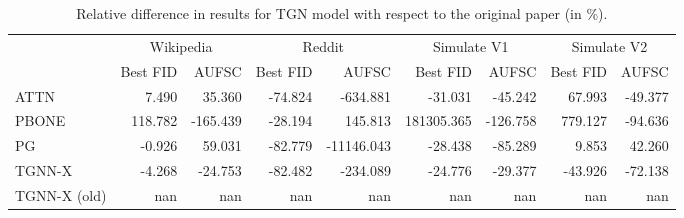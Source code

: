 \begin{table}
\centering
\begin{tabular}{lrrrrrrrr}
\toprule
 & \multicolumn{2}{c}{Wikipedia} & \multicolumn{2}{c}{Reddit} & \multicolumn{2}{c}{Simulate V1} & \multicolumn{2}{c}{Simulate V2} \\
 & Best FID & AUFSC & Best FID & AUFSC & Best FID & AUFSC & Best FID & AUFSC \\
\midrule
ATTN & 7.490 & 35.360 & -74.824 & -634.881 & -31.031 & -45.242 & 67.993 & -49.377 \\
PBONE & 118.782 & -165.439 & -28.194 & 145.813 & 181305.365 & -126.758 & 779.127 & -94.636 \\
PG & -0.926 & 59.031 & -82.779 & -11146.043 & -28.438 & -85.289 & 9.853 & 42.260 \\
TGNN-X & -4.268 & -24.753 & -82.482 & -234.089 & -24.776 & -29.377 & -43.926 & -72.138 \\
TGNN-X (old) & nan & nan & nan & nan & nan & nan & nan & nan \\
\bottomrule
\end{tabular}
\caption{\label{tab:tgn_results_diff}Relative difference in results for TGN model with respect to the original paper (in \%).}
\end{table}
